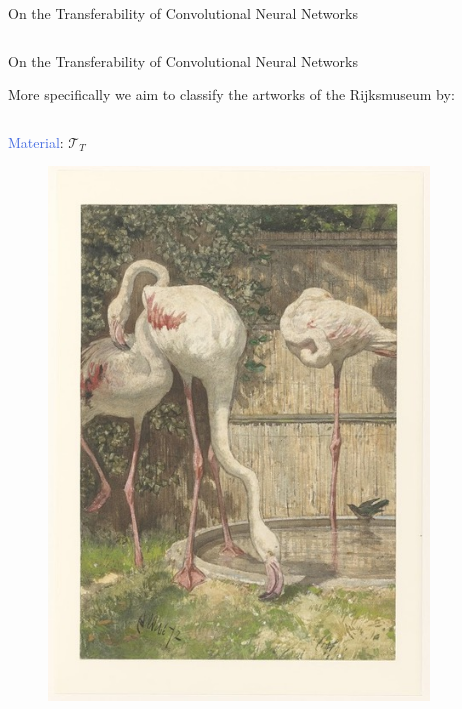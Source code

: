 \documentclass{beamer}
\newcommand*\circled[1]{\tikz[baseline=(char.base)]{
            \node[shape=circle,draw,inner sep=0.5pt] (char) {#1};}}
\begin{document}
\begin{frame}{On the Transferability of Convolutional Neural Networks}
\begin{columns}
\begin{column}{.5\textwidth}
		\end{column}
		
	\end{columns}

\end{frame}


\begin{frame}{On the Transferability of Convolutional Neural Networks}

	More specifically we aim to classify the artworks of the Rijksmuseum by:
	\bigskip

	\begin{columns}
		\begin{column}{.3\textwidth}
			\textcolor{RoyalBlue}{Material}: $\mathcal{T}_T$ \circled{1}
			\begin{figure}
				\includegraphics[width=0.9\textwidth]{figures/paper}
			\end{figure}
		\end{column}
		

\end{columns}
\end{frame}
\end{document}
